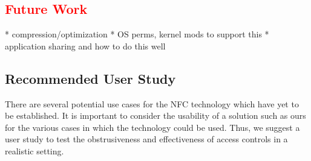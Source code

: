 \documentclass[12pt]{article}
\newcommand\TODO[1]{\textcolor{red}{#1}}
\begin{document}



\TODO{\section{Future Work}}
* compression/optimization
* OS perms, kernel mods to support this
* application sharing and how to do this well

\subsection{Recommended User Study}
There are several potential use cases for the NFC technology which have yet to be established. It is important to consider the usability of a solution such as ours for the various cases in which the technology could be used. Thus, we suggest a user study to test the obstrusiveness and effectiveness of access controls in a realistic setting. 
\end{document}
